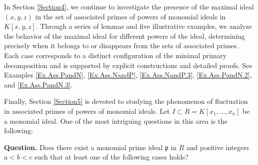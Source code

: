 \documentclass[11pt]{amsart}
\begin{document}
 In Section \ref{Section4}, we continue to investigate the presence of the maximal ideal $(x,y,z)$ in the set of associated primes of powers of monomial ideals in $K[x,y,z]$. Through a series of lemmas and five illustrative examples, we analyze the behavior of the maximal ideal for different powers of the ideal, determining precisely when it belongs to or disappears from the sets of associated primes. Each case corresponds to a distinct configuration of the minimal primary decomposition and is supported by explicit constructions and detailed proofs. See Examples \ref{Ex.Ass.PandN}, \ref{Ex.Ass.NandP}, 
 \ref{Ex.Ass.NandP.3}, \ref{Ex.Ass.PandN.2}, and \ref{Ex.Ass.PandN.3}. 

 Finally, Section \ref{Section5}   is devoted to studying the  phenomenon of fluctuation in associated primes of powers of monomial ideals. 
 Let $I\subset R=K[x_1, \ldots, x_n]$ be a monomial ideal. One of the most  intriguing questions in this area is the following:

\medskip
\noindent\textbf{Question.}
Does there exist a monomial prime ideal $\mathfrak{p}$ in $R$ and positive
integers $a < b < c$ such that at least one of the following cases holds?
\end{document}
